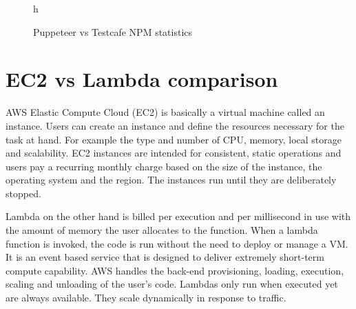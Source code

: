 \documentclass[12pt,a4paper,titlepage]{report}
\begin{document}
\begin{figure}{h}
 \centering
 \qquad
 \caption{Puppeteer vs Testcafe NPM statistics}
\end{figure}

\section{EC2 vs Lambda comparison}

AWS Elastic Compute Cloud (EC2) is basically a virtual machine called an instance. Users can create an instance and define
the resources necessary for the task at hand. For example the type and number of CPU, memory, local storage and scalability. EC2 instances
are intended for consistent, static operations and users pay a recurring monthly charge based on the size of the instance, the operating
system and the region. The instances run until they are deliberately stopped.

Lambda on the other hand is billed per execution and per millisecond in use with the amount of memory the user allocates to the function.
When a lambda function is invoked, the code is run without the need to deploy or manage a VM\@. It is an event based service that is
designed to deliver extremely short-term compute capability. AWS handles the back-end provisioning, loading, execution, scaling and unloading of the user's code.
Lambdas only run when executed yet are always available. They scale dynamically in response to traffic.
\end{document}

